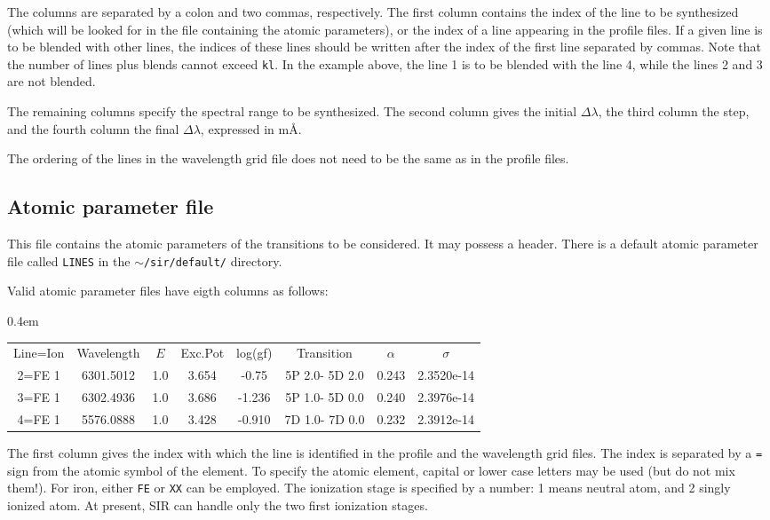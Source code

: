 The columns are separated by a colon and two commas, respectively. The
first column contains the index of the line to be synthesized (which
will be looked for in the file containing the atomic parameters), or
the index of a line appearing in the profile files. If a given line is
to be blended with other lines, the indices of these lines should be
written after the index of the first line separated by commas. Note
that the number of lines plus blends cannot exceed {\tt kl}. In the
example above, the line 1 is to be blended with the line 4, while the
lines 2 and 3 are not blended.

The remaining columns specify the spectral range to be synthesized. The
second column gives the initial $\Delta \lambda$, the third column the
step, and the fourth column the final $\Delta \lambda$, expressed in m\AA\/. 

The ordering of the lines in the wavelength grid file does not need to
be the same as in the profile files. 

\subsection{Atomic parameter file}
\label{damping}
This file contains the atomic parameters of the transitions to be
considered. It may possess a header. There is a default atomic
parameter file called {\tt LINES} in the {\tt $\sim$/sir/default/} directory.

Valid atomic parameter files have eigth columns as follows:
\begin{center}
\tabcolsep 0.4em
\tt
\begin{tabular}{cccccccc}
 Line=Ion & Wavelength & $E$ & Exc.Pot & log(gf) &  Transition & $\alpha$ & $\sigma$  \\
   2=FE 1 & 6301.5012 &   1.0 & 3.654 & -0.75  & 5P 2.0- 5D 2.0 & 0.243  & 2.3520e-14 \\
   3=FE 1 & 6302.4936 &   1.0 & 3.686 & -1.236 & 5P 1.0- 5D 0.0 & 0.240  & 2.3976e-14  \\
   4=FE 1 & 5576.0888 &   1.0 & 3.428 & -0.910 & 7D 1.0- 7D 0.0 & 0.232  & 2.3912e-14 \\
\end{tabular}
\end{center}
The first column gives the index with which the line is identified in
the profile and the wavelength grid files. The index is separated by a
{\tt =} sign from the atomic symbol of the element. To specify the
atomic element, capital or lower case letters may be used (but do not
mix them!). For iron, either {\tt FE} or {\tt XX} can be employed. The
ionization stage is specified by a number: 1 means neutral atom, and 2
singly ionized atom. At present, SIR can handle only the two first
ionization stages.

